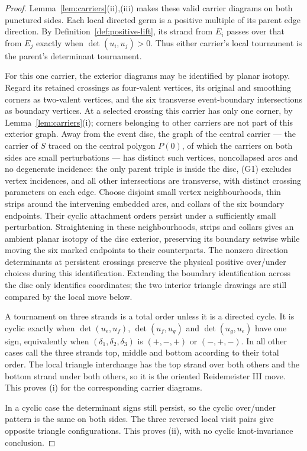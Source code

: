 \begin{proof}
Lemma~\ref{lem:carriers}(ii),(iii) makes these valid carrier
diagrams on both punctured sides. Each local directed germ is a
positive multiple of its parent edge direction. By
Definition~\ref{def:positive-lift}, its strand from $E_i$ passes
over that from $E_j$ exactly when $\det(u_i,u_j)>0$.
Thus either carrier's local tournament is the parent's determinant
tournament.

For this one carrier, the exterior diagrams may be identified by
planar isotopy. Regard its retained crossings as four-valent vertices,
its original and smoothing corners as two-valent vertices, and the
six transverse event-boundary intersections as boundary vertices.
At a selected crossing this carrier has only one corner, by
Lemma~\ref{lem:carriers}(i); corners belonging to other carriers
are not part of this exterior graph. Away from the event disc, the
graph of the central carrier --- the carrier of $S$ traced on the central
polygon $P(0)$, of which the carriers on both sides are small perturbations
--- has distinct such vertices, noncollapsed arcs and no
degenerate incidence: the only parent triple is inside the disc,
(G1) excludes vertex incidences, and all other intersections are transverse, with distinct crossing
parameters on each edge. Choose disjoint small vertex
neighbourhoods, thin strips around the intervening embedded arcs,
and collars of the six boundary endpoints. Their cyclic attachment
orders persist under a sufficiently small perturbation.
Straightening in these neighbourhoods, strips and collars gives an
ambient planar isotopy of the disc exterior, preserving its boundary
setwise while moving the six marked endpoints to their counterparts.
The nonzero direction determinants at persistent crossings preserve
the physical positive over/under choices during this identification.
Extending the boundary identification across the disc only identifies
coordinates; the two interior triangle drawings are still compared
by the local move below.

A tournament on three strands is a total order unless it is a
directed cycle. It is cyclic exactly when
$\det(u_e,u_f)$, $\det(u_f,u_g)$ and $\det(u_g,u_e)$ have one
sign, equivalently when $(\delta_1,\delta_2,\delta_3)$ is
$(+,-,+)$ or $(-,+,-)$.
In all other cases call the three strands top, middle and bottom
according to their total order. The local triangle interchange has
the top strand over both others and the bottom strand under both
others, so it is the oriented Reidemeister III move.
This proves (i) for the corresponding carrier diagrams.

In a cyclic case the determinant signs still persist, so the cyclic
over/under pattern is the same on both sides. The three reversed
local visit pairs give opposite triangle configurations.
This proves (ii), with no cyclic knot-invariance conclusion.
\end{proof}

